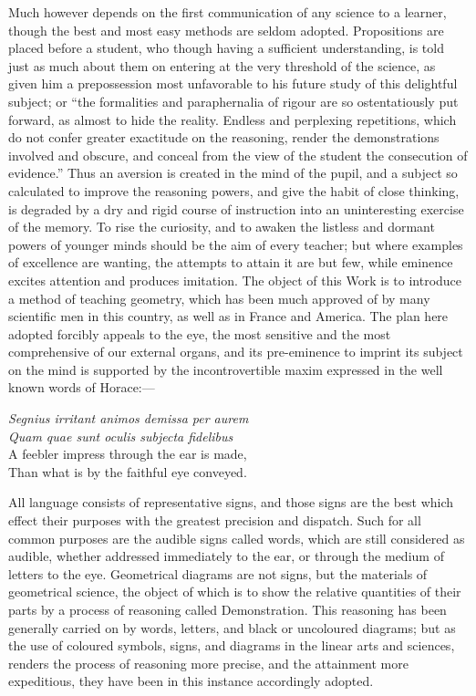 \documentclass{byrnebook}
\begin{document}
Much however depends on the first communication of any science to a learner, though the best and most easy methods are seldom adopted. Propositions are placed before a student, who though having a sufficient understanding, is told just as much about them on entering at the very threshold of the science, as given him a prepossession most unfavorable to his future study of this delightful subject; or \enquote{the formalities and paraphernalia of rigour are so ostentatiously put forward, as almost to hide the reality. Endless and perplexing repetitions, which do not confer greater exactitude on the reasoning, render the demonstrations involved and obscure, and conceal from the view of the student the consecution of evidence.} %
Thus an aversion is created in the mind of the pupil, and a subject so calculated to improve the reasoning powers, and give the habit of close thinking, is degraded by a dry and rigid course of instruction into an uninteresting exercise of the memory. To rise the curiosity, and to awaken the listless and dormant powers of younger minds should be the aim of every teacher; but where examples of excellence are wanting, the attempts to attain it are but few, while eminence excites attention and produces imitation. The object of this Work is to introduce a method of teaching geometry, which has been much approved of by many scientific men in this country, as well as in France and America. The plan here adopted forcibly appeals to the eye, the most sensitive and the most comprehensive of our external organs, and its pre-eminence to imprint its subject on the mind is supported by the incontrovertible maxim expressed in the well known words of Horace:—

\begin{center}
\emph{Segnius irritant animos demissa per aurem\\
Quam quae sunt oculis subjecta fidelibus}\\
\baselineskip
A feebler impress through the ear is made,\\
Than what is by the faithful eye conveyed.
\end{center}

All language consists of representative signs, and those signs are the best which effect their purposes with the greatest precision and dispatch. Such for all common purposes are the audible signs called words, which are still considered as audible, whether addressed immediately to the ear, or through the medium of letters to the eye. Geometrical diagrams are not signs, but the materials of geometrical science, the object of which is to show the relative quantities of their parts by a process of reasoning called Demonstration. This reasoning has been generally carried on by words, letters, and black or uncoloured diagrams; but as the use of coloured symbols, signs, and diagrams in the linear arts and sciences, renders the process of reasoning more precise, and the attainment more expeditious, they have been in this instance accordingly adopted.
\end{document}
